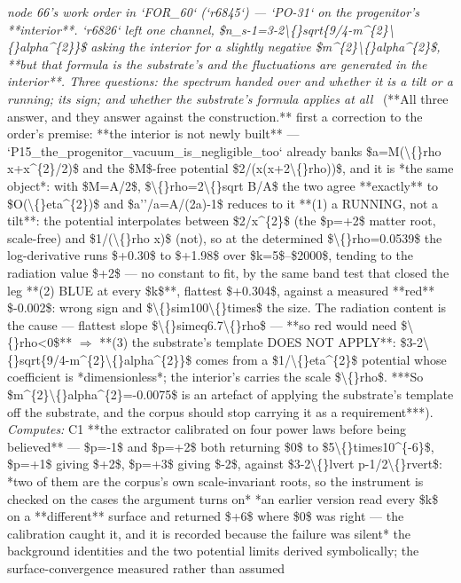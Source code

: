 \begin{description}
\textit{node 66's work order in `FOR\_60` (`r6845`) --- `PO-31` on the progenitor's **interior**. `r6826` left one channel, \$n\_s-1=3-2\textbackslash\{\}sqrt\{9/4-m\textasciicircum{}\{2\}\textbackslash\{\}alpha\textasciicircum{}\{2\}\}\$ asking the interior for a slightly negative \$m\textasciicircum{}\{2\}\textbackslash\{\}alpha\textasciicircum{}\{2\}\$, **but that formula is the substrate's and the fluctuations are generated in the interior**. Three questions: the spectrum handed over and whether it is a tilt or a running; its sign; and whether the substrate's formula applies at all} \ (**All three answer, and they answer against the construction.**   first a correction to the order's premise: **the interior is not newly built** --- `P15\_the\_progenitor\_vacuum\_is\_negligible\_too` already banks \$a=M(\textbackslash\{\}rho x+x\textasciicircum{}\{2\}/2)\$ and the \$M\$-free potential \$2/(x(x+2\textbackslash\{\}rho))\$, and it is *the same object*: with \$M=A/2\$, \$\textbackslash\{\}rho=2\textbackslash\{\}sqrt B/A\$ the two agree **exactly** to \$O(\textbackslash\{\}eta\textasciicircum{}\{2\})\$ and \$a''/a=A/(2a)-1\$ reduces to it  **(1) a RUNNING, not a tilt**: the potential interpolates between \$2/x\textasciicircum{}\{2\}\$ (the \$p=+2\$ matter root, scale-free) and \$1/(\textbackslash\{\}rho x)\$ (not), so at the determined \$\textbackslash\{\}rho=0.0539\$ the log-derivative runs \$+0.30\$ to \$+1.98\$ over \$k=5\$--\$2000\$, tending to the radiation value \$+2\$ --- no constant to fit, by the same band test that closed the leg  **(2) BLUE at every \$k\$**, flattest \$+0.304\$, against a measured **red** \$-0.002\$: wrong sign and \$\textbackslash\{\}sim100\textbackslash\{\}times\$ the size. The radiation content is the cause --- flattest slope \$\textbackslash\{\}simeq6.7\textbackslash\{\}rho\$ --- **so red would need \$\textbackslash\{\}rho<0\$** \ensuremath{\Rightarrow}  **(3) the substrate's template DOES NOT APPLY**: \$3-2\textbackslash\{\}sqrt\{9/4-m\textasciicircum{}\{2\}\textbackslash\{\}alpha\textasciicircum{}\{2\}\}\$ comes from a \$1/\textbackslash\{\}eta\textasciicircum{}\{2\}\$ potential whose coefficient is *dimensionless*; the interior's carries the scale \$\textbackslash\{\}rho\$. ***So \$m\textasciicircum{}\{2\}\textbackslash\{\}alpha\textasciicircum{}\{2\}=-0.0075\$ is an artefact of applying the substrate's template off the substrate, and the corpus should stop carrying it as a requirement***). 
\emph{Computes:} C1 **the extractor calibrated on four power laws before being believed** --- \$p=-1\$ and \$p=+2\$ both returning \$0\$ to \$5\textbackslash\{\}times10\textasciicircum{}\{-6\}\$, \$p=+1\$ giving \$+2\$, \$p=+3\$ giving \$-2\$, against \$3-2\textbackslash\{\}lvert p-1/2\textbackslash\{\}rvert\$: *two of them are the corpus's own scale-invariant roots, so the instrument is checked on the cases the argument turns on*  *an earlier version read every \$k\$ on a **different** surface and returned \$+6\$ where \$0\$ was right --- the calibration caught it, and it is recorded because the failure was silent*  the background identities and the two potential limits derived symbolically; the surface-convergence measured rather than assumed

\end{description}
